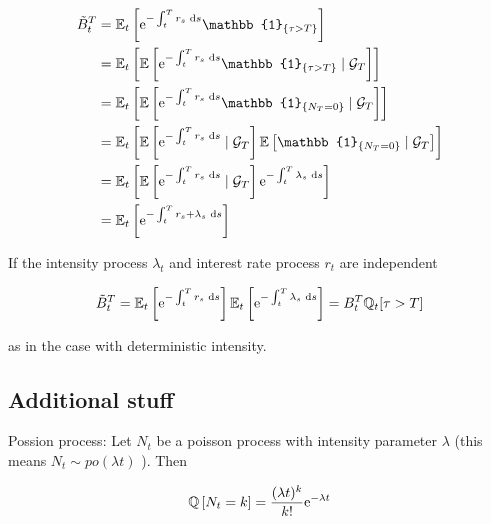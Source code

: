 $$
\begin{aligned}
\tilde{B}_{t}^{T} & =\E_{t}\left[\e^{-\int_{t}^{T} r_{s} \d  s} \mathbb{1}_{\{\tau>T\}}\right] \\
& =\E_{t}\left[\E\left[\e^{-\int_{t}^{T} r_{s} \d  s} \mathbb{1}_{\{\tau>T\}} \mid \mathcal{G}_{T}\right]\right] \\
& =\E_{t}\left[\E\left[\e^{-\int_{t}^{T} r_{s} \d  s} \mathbb{1}_{\left\{N_{T}=0\right\}} \mid \mathcal{G}_{T}\right]\right] \\
& =\E_{t}\left[\E\left[\e^{-\int_{t}^{T} r_{s} \d  s} \mid \mathcal{G}_{T}\right] \E\left[\mathbb{1}_{\left\{N_{T}=0\right\}} \mid \mathcal{G}_{T}\right]\right] \\
& =\E_{t}\left[\E\left[\e^{-\int_{t}^{T} r_{s} \d  s} \mid \mathcal{G}_{T}\right] \e^{-\int_{t}^{T} \lambda_{s} \d  s}\right] \\
& =\E_{t}\left[\e^{-\int_{t}^{T} r_{s}+\lambda_{s} \d  s}\right]
\end{aligned}
$$

If the intensity process $\lambda_{t}$ and interest rate process $r_{t}$ are independent

$$
\tilde{B}_{t}^{T}=\mathbb{E}_{t}\left[\mathrm{e}^{-\int_{t}^{T} r_{s} \text{ d}  s}\right] \mathbb{E}_{t}\left[\mathrm{e}^{-\int_{t}^{T} \lambda_{s} \text{ d}  s}\right]=B_{t}^{T} \mathbb{Q}_{t}[\tau>T]
$$

as in the case with deterministic intensity.

\subsection{Additional stuff}
Possion process: Let $N_{t}$ be a poisson process with intensity parameter $\lambda$ (this means $N_{t} \sim p o(\lambda t)$ ). Then

$$
\mathbb{Q}\left[N_{t}=k\right]=\frac{(\lambda t)^{k}}{k!} \mathrm{e}^{-\lambda t}
$$

